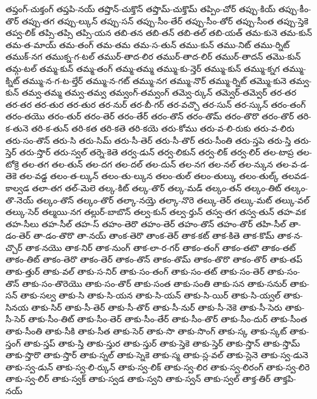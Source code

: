 {తప్తంగ్-చుక్తంగ్
తప్తపి-నయ్
తప్తొన్-చుక్తొన్
తప్తొమ్-చుక్తొమ్
తప్పిం-చోర్
తప్పు-కియ్
తప్పు-కీం-తొర్
తప్పు-తగ
తప్పు-ల్కున్
తప్పు-సన్
తప్పు-సీం-తేర్
తప్పు-సీం-తోర్
తప్పు-సీంత
తప్పు-స్తెకె
తప్వ-లిక్
తప్సి-తప్సి
తప్సి-యన
తబి-తన
తబి-తన్
తబి-తల్
తబి-యత్
తమ-కునె
తమ-కున్
తమ-త-మాయ్
తమ-తంగ్
తమ-తమ
తమ-స-తున్
తము-కున్
తము-నిట్
తము-ర్నిట్
తముక్-నగ
తముక్న-గ-టల్
తముర్-తాద-లిర
తముర్-తాద-లిర్
తముర్-తాదన్
తమొ-కున్
తమ్గ-టల్
తమ్మ-కున్
తమ్మ-తంగ్
తమ్మ-తమ్మ
తమ్ము-కు-న్తెర్
తమ్ము-కున్
తమ్ము-క్నగ
తమ్ము-క్నిట్
తమ్ము-న-గ-ట-ల్తేర్
తమ్ము-న-గట్
తమ్ము-నగ
తమ్ము-నొర్
తమ్ము-ర్నిట్
తమ్మొ-కునె
తమ్వ-కున్
తమ్వ-తమ్మ
తమ్వ-తమ్వ
తమ్వంగ్-తమ్వంగ్
తమ్వె-ర్కున్
తమ్వెర్-తమ్వెర్
తర-తర
తర-తర
తర-తుర
తర-తుర
తర-నుర్
తర-బీ-గర్
తర-వచ్చొ
తర-సున్
తర-స్కున్
తరం-తంగ్
తరం-తయొ
తరం-తుర్
తరం-తెర్
తరం-తేర్
తరం-తొన్
తరం-తొమ్
తరం-తొరొ
తరం-తొర్
తరి-క-తునె
తరి-క-తున్
తరి-కత
తరి-కతె
తరి-కయె
తరు-కోము
తరు-వ-లి-రుకు
తరు-వ-లిరు
తరు-సం-తొన్
తరు-సి
తరు-సిమ్
తరు-సీ-తెర్
తరు-సీ-తొర్
తరు-సీంతి
తరు-స్తపె
తరు-స్తి
తరు-స్తెర్
తరు-స్తొర్
తరు-స్వల్
తర్నె-కెతె
తర్వ-డున్
తర్వ-లికున్
తర్వ-లిక్
తర్వ-లిర్
తల-టాప్ర
తల-టోక్రె
తల-తగ
తల-తున్
తల-దగ
తల-దల్
తల-దున్
తల-నగ
తల-నల్
తల-న్కున
తల-వ-డ-తెకె
తల-వడ్డ
తలం-త-ల్కున్
తలం-తు-ల్కున
తలం-తుల్
తలం-తుల్కు
తలం-తుల్క్
తలవడ-కాల్వడ
తలా-తగ
తల్-మెలె
తల్క-కిట్
తల్క-తొర్
తల్క-మడ్
తల్కం-తన్
తల్కం-తిట్
తల్కం-తొ-నెయ్
తల్కం-తొన్
తల్కం-తొర్
తల్కా-నయ్తె
తల్కా-నొరె
తల్కు-తెర్
తల్కు-మట్
తల్కు-వల్
తల్కు-సెర్
తల్మయి-నగ
తల్లుర్-బాబొన్
తల్వ-కున్
తల్వ-ర్తున్
తస్వ-తగ
తస్వ-తున్
తహ-వక
తహ-సీలు
తహ-సీల్
తహ-స్
తహం-తెరొ
తహం-తెర్
తహం-తొన్
తహం-తొర్
తహి-సీల్
తా-డం-తెర్
తా-డం-తొరొ
తా-నయ్
తాంక-తెరొ
తాంక-తెర్
తాక-కట్
తాక-కితె
తాక-కొమ్
తాక-న-చ్చొర్
తాక-నయొ
తాక-నిర్
తాక-నుంగ్
తాక-లా-ర-గర్
తాకం-తంగ్
తాకం-తటొ
తాకం-తట్
తాకం-తిట్
తాకం-తెరొ
తాకం-తెర్
తాకం-తొన్
తాకం-తొమ్
తాకం-తొరొ
తాకం-తొర్
తాకు-తప్
తాకు-త్తుర్
తాకు-వల్
తాకు-స-నిర్
తాకు-సం-తంగ్
తాకు-సం-తట్
తాకు-సం-తెర్
తాకు-సం-తొన్
తాకు-సం-తొరెయొ
తాకు-సం-తొర్
తాకు-సంత
తాకు-సంతి
తాకు-సన
తాకు-సనుర్
తాకు-సన్
తాకు-సల్వ
తాకు-సి
తాకు-సి-యన
తాకు-సి-యన్
తాకు-సి-యిర్
తాకు-సి-య్వల్
తాకు-సినయ
తాకు-సిర్
తాకు-సీ-తెర్
తాకు-సీ-తొర్
తాకు-సీ-నుర్
తాకు-సీ-నెకె
తాకు-సీ-సెరు
తాకు-సీ-సెర్
తాకు-సీం-తిట్
తాకు-సీం-తెర్
తాకు-సీం-తేర్
తాకు-సీం-తొర్
తాకు-సీం-దుర్
తాకు-సీంత
తాకు-సీంతి
తాకు-సీకి
తాకు-సీత
తాకు-సెర్
తాకు-సొ
తాకు-సొంగ్
తాకు-స్క
తాకు-స్కట్
తాకు-స్తంగ్
తాకు-స్తప్
తాకు-స్తి
తాకు-స్తుర
తాకు-స్తుర్
తాకు-స్తెకె
తాకు-స్తెర్
తాకు-స్తొన్
తాకు-స్తొమ్
తాకు-స్తొరొ
తాకు-స్తొర్
తాకు-స్నల్
తాకు-స్నెకె
తాకు-స్మ
తాకు-స్ల-వల్
తాకు-స్లెనె
తాకు-స్వ-డునె
తాకు-స్వ-డున్
తాకు-స్వ-లి-ర్కున్
తాకు-స్వ-లిక్
తాకు-స్వ-లిర
తాకు-స్వ-లిరంగ్
తాకు-స్వ-లిరె
తాకు-స్వ-లిర్
తాకు-స్వక్
తాకు-స్వడ
తాకు-స్వని
తాకు-స్వన్
తాకు-స్వల్
తాక్త-తిర్
తాక్తపి-నయ్
}

